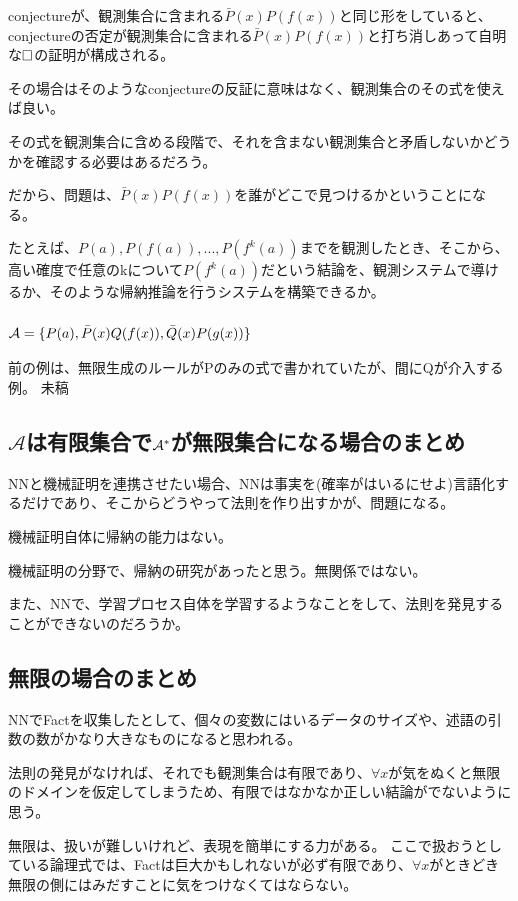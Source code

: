 \documentclass[10pt, oneside]{jarticle}   	%
\begin{document}
conjectureが、観測集合に含まれる$\bar{P}(x)P(f(x))$と同じ形をしていると、conjectureの否定が観測集合に含まれる$\bar{P}(x)P(f(x))$と打ち消しあって自明な$\Box$の証明が構成される。

その場合はそのようなconjectureの反証に意味はなく、観測集合のその式を使えば良い。

その式を観測集合に含める段階で、それを含まない観測集合と矛盾しないかどうかを確認する必要はあるだろう。

だから、問題は、$\bar{P}(x)P(f(x))$を誰がどこで見つけるかということになる。

たとえば、$P(a),P(f(a)),...,P(f^k(a))$までを観測したとき、そこから、高い確度で任意のkについて$P(f^k(a))$だという結論を、観測システムで導けるか、そのような帰納推論を行うシステムを構築できるか。


\subsubsection{$\mathcal{A}=\{{P(a), \bar{P}(x)Q(f(x)), \bar{Q}(x)P(g(x))}\}$}
前の例は、無限生成のルールがPのみの式で書かれていたが、間にQが介入する例。
未稿

\subsection{$\mathcal{A}$は有限集合で$\mathcal{A}^{*}$が無限集合になる場合のまとめ}

NNと機械証明を連携させたい場合、NNは事実を(確率がはいるにせよ)言語化するだけであり、そこからどうやって法則を作り出すかが、問題になる。

機械証明自体に帰納の能力はない。

機械証明の分野で、帰納の研究があったと思う。無関係ではない。

また、NNで、学習プロセス自体を学習するようなことをして、法則を発見することができないのだろうか。



\subsection{無限の場合のまとめ}
NNでFactを収集したとして、個々の変数にはいるデータのサイズや、述語の引数の数がかなり大きなものになると思われる。

法則の発見がなければ、それでも観測集合は有限であり、$\forall x$が気をぬくと無限のドメインを仮定してしまうため、有限ではなかなか正しい結論がでないように思う。

無限は、扱いが難しいけれど、表現を簡単にする力がある。
ここで扱おうとしている論理式では、Factは巨大かもしれないが必ず有限であり、$\forall x$がときどき無限の側にはみだすことに気をつけなくてはならない。
\end{document}
